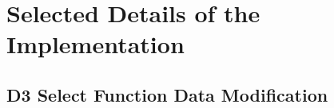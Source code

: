 \chapter{Selected Details of the Implementation}

\label{chap:SelectedDetails}


\section{D3 Select Function Data Modification}

